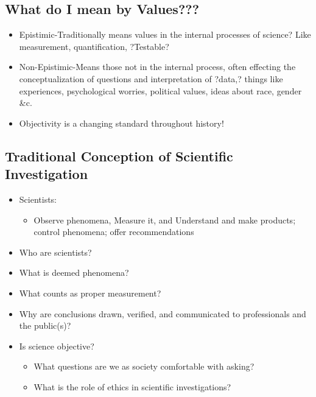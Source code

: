 \documentclass[11pt]{article}
\begin{document}
\subsection{What do I mean by Values???}
\label{sec-2-1}

\begin{itemize}
\item Epistimic-Traditionally means values in the internal processes of science? 
Like measurement, quantification, ?Testable?

\item Non-Epistimic-Means those not in the internal process, often effecting the conceptualization of questions and interpretation of ?data,? things like experiences, psychological worries, political values, ideas about race, gender \&c.

\item Objectivity is a changing standard throughout history!
\end{itemize}


\subsection{Traditional Conception of Scientific Investigation}
\label{sec-2-2}
\begin{itemize}
\item Scientists:

\begin{itemize}
\item Observe phenomena, Measure it, and Understand and make products; control phenomena; offer recommendations
\end{itemize}

\item Who are scientists?

\item What is deemed phenomena?

\item What counts as proper measurement?

\item Why are conclusions drawn, verified, and communicated to professionals and the public(s)?

\item Is science objective? 

\begin{itemize}
\item What questions are we as society comfortable with asking?

\item What is the role of ethics in scientific investigations?
\end{itemize}
\end{itemize}
\end{document}
